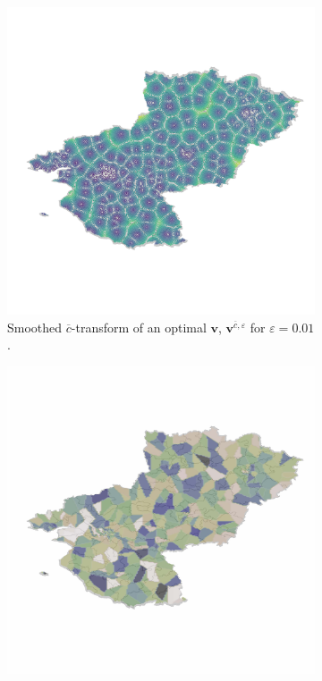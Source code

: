 \begin{figure}[h]
    \centering
    \begin{subfigure}{.49\linewidth}
        \centering
        \includegraphics[width=\linewidth]{figures/opti_nantes.pdf}
        \caption{Smoothed $\overline{c}$-transform of an optimal $\bm{v}$, $\bm{v}^{\overline{c}, \varepsilon}$ for $\varepsilon = 0.01$.}
        \label{fig:loire-c-trans}
    \end{subfigure}
    \begin{subfigure}{.49\linewidth}
        \centering
        \includegraphics[width=\linewidth]{figures/opti_nantes_cells.jpg}

\end{subfigure}
\end{figure}

